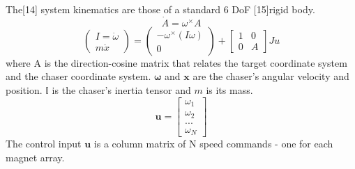 
The[14] system kinematics are those of a standard 6 DoF [15]rigid body. 
\begin{equation}\label{eq:rotMrxPropigation}
\dot{A} = \omega^{\times}A
\end{equation}
\begin{equation}\label{eq:RigidBodyKinematics}
\begin{pmatrix} 
I =\dot{\omega} \\
m\ddot{x}
 \end{pmatrix}
=
\begin{pmatrix} 
-\omega^{ \times} \left( I\omega \right) \\
0
\end{pmatrix}
+
\begin{bmatrix}
1 & 0 \\
0 & A
\end{bmatrix}
Ju
\end{equation}
where A is the direction-cosine matrix that relates the target coordinate system and the chaser coordinate system. $\boldsymbol{\omega}$ and $\boldsymbol{x}$ are the chaser's angular velocity and position. $\mathbb{I}$ is the chaser's inertia tensor and $m$ is its mass.
\begin{equation}
\label{eq:u_definition}
\boldsymbol{u} = 
\begin{bmatrix}
\omega_1\\
\omega_2\\
...\\
\omega_N
\end{bmatrix}
\end{equation}
The control input $\boldsymbol{u}$ is a column matrix of N speed commands - one for each magnet array.

